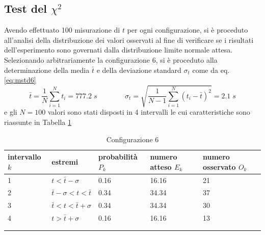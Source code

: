 \documentclass[11pt,a4paper]{article}
\begin{document}
\subsection{Test del $\chi^2$}
Avendo effettuato 100 misurazione di $t$ per ogni configurazione, si è proceduto all'analisi della distribuzione dei valori osservati al fine di verificare se i risultati dell'esperimento sono governati dalla distribuzione limite normale attesa. Selezionando arbitrariamente la configurazione 6, si è proceduto alla determinazione della media $\bar{t}$ e della deviazione standard $\sigma_t$ come da eq. \ref{eq:mstd6}
\begin{equation}
    \bar{t} = \frac{1}{N} \sum_{i=1}^N t_i = 777.2 \; s \; \; \; \; \; \; \; \; \; \; \; \; \; \; \sigma_t = \sqrt{\frac{1}{N-1} \sum_{i=1}^N  (t_i - \bar{t})^2} = 2.1 \; s
    \label{eq:mstd6}
\end{equation}
e gli $N=100$ valori sono stati disposti in 4 intervalli le cui caratteristiche sono riassunte in Tabella \ref{tab:conf6}
\begin{longtable}[]{@{}lllll@{}}
    \toprule
    intervallo $k$ & estremi & probabilità $P_k$ & numero atteso $E_k$ & numero osservato $O_k$\tabularnewline
    \midrule
    \endhead
    1 & $t < \bar{t} - \sigma$ & 0.16 & 16.16 & 21 \tabularnewline
    2 & $\bar{t} - \sigma< t < \bar{t}$ & 0.34 & 34.34 & 37 \tabularnewline
    3 & $\bar{t} < t < \bar{t} + \sigma$ & 0.34 & 34.34 & 30 \tabularnewline
    4 & $t > \bar{t} + \sigma$ & 0.16 & 16.16 & 13 \tabularnewline
    \bottomrule
    \label{tab:conf6}
    \\
    \caption{Configurazione 6}
\end{longtable}
\end{document}
